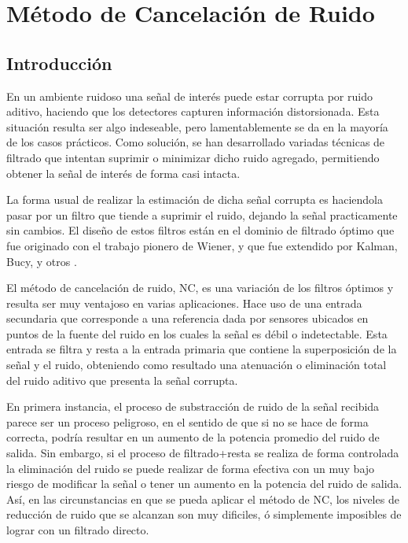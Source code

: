 \chapter{Método de Cancelación de Ruido}

\section{Introducción}
En un ambiente ruidoso una señal de interés puede estar corrupta por ruido aditivo, haciendo que los detectores capturen información distorsionada. Esta situación resulta ser algo indeseable, pero lamentablemente se da en la mayoría de los casos prácticos. Como solución, se han desarrollado variadas técnicas de filtrado que intentan suprimir o minimizar dicho ruido agregado, permitiendo obtener la señal de interés de forma casi intacta.

La forma usual de realizar la estimación de dicha señal corrupta es haciendola pasar por un filtro que tiende a suprimir el ruido, dejando la señal practicamente sin cambios. El diseño de estos filtros están en el dominio de filtrado óptimo que fue originado con el trabajo pionero de Wiener, y que fue extendido por Kalman, Bucy, y otros \cite{torres-phdthesis}.


El método de cancelación de ruido, \ac{NC}, es una variación de los filtros óptimos y resulta ser muy ventajoso en varias aplicaciones. Hace uso de una entrada secundaria que corresponde a una referencia dada por sensores ubicados en puntos de la fuente del ruido en los cuales la señal es débil o indetectable. Esta entrada se filtra y resta a la entrada primaria que contiene la superposición de la señal y el ruido, obteniendo como resultado una atenuación o eliminación total del ruido aditivo que presenta la señal corrupta.

En primera instancia, el proceso de substracción de ruido de la señal recibida parece ser un proceso peligroso, en el sentido de que si no se hace de forma correcta, podría resultar en un aumento de la potencia promedio del ruido de salida. Sin embargo, si el proceso de filtrado+resta se realiza de forma controlada la eliminación del ruido se puede realizar de forma efectiva con un muy bajo riesgo de modificar la señal o tener un aumento en la potencia del ruido de salida. Así, en las circunstancias en que se pueda aplicar el método de \ac{NC}, los niveles de reducción de ruido que se alcanzan son muy dificiles, ó simplemente imposibles de lograr con un filtrado directo.

